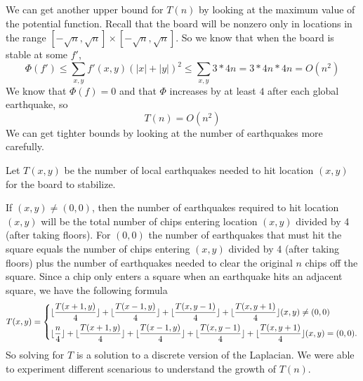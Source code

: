 \documentclass[runningheads,a4paper]{llncs}
\begin{document}
We can get another upper bound for $T(n)$ by looking at the maximum value of the potential function. Recall that the board will be nonzero only in locations in the range $[-\sqrt{n}, \sqrt{n}] \times [-\sqrt{n}, \sqrt{n}]$. 
So we know that when the board is stable at some $f'$, 
\begin{equation*}
\Phi(f') \leq \sum_{x,y} f'(x,y)(|x| + |y|)^2 \leq \sum_{x,y} 3*4n = 3*4n*4n= O(n^2)
\end{equation*}
We know that $\Phi(f) = 0$ and that $\Phi$ increases by at least $4$ after each global earthquake, so
\[ T(n) = O(n^2) \]
We can get tighter bounds by looking at the number of earthquakes more carefully.
\begin{definition}
 Let $T(x,y)$ be the number of local earthquakes needed to hit location $(x,y)$ for the board to stabilize. 
 \end{definition}
 If $(x,y) \neq (0,0)$, then the number of earthquakes required to hit location $(x,y)$ will be the total number of chips entering location $(x,y)$ divided by 4 (after taking floors). For $(0,0)$ the number of earthquakes that must hit the square equals the number of chips entering $(x,y)$ divided by 4 (after taking floors) plus the number of earthquakes needed to clear the original $n$ chips off the square.
 Since a chip only enters a square when an earthquake hits an adjacent square, we have the following formula
\begin{equation*}
T(x,y) = \begin{dcases} \lfloor\frac{T(x+1, y)}{4} \rfloor + \lfloor \frac{T(x-1, y)}{4} \rfloor + \lfloor \frac{T(x, y-1)}{4} \rfloor + \lfloor \frac{T(x, y+1)}{4} \rfloor  (x,y) \neq (0,0) \\
 \lfloor \frac{n}{4} \rfloor  + \lfloor\frac{T(x+1, y)}{4} \rfloor + \lfloor \frac{T(x-1, y)}{4} \rfloor + \lfloor \frac{T(x, y-1)}{4} \rfloor + \lfloor \frac{T(x, y+1)}{4} \rfloor  (x,y) = (0,0) .
 \end{dcases}
 \end{equation*}
So solving for $T$ is a solution to a discrete version of the Laplacian. We were able to experiment different scenarious to understand the growth of $T(n)$. 
\end{document}
